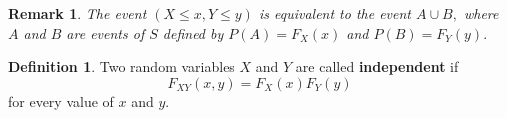 \documentclass[12pt, a4paper]{article}
\newtheorem*{remark}{Remark}
\theoremstyle{definition}
\newtheorem{definition}{Definition}[section]
\theoremstyle{plain}
\begin{document}
\begin{remark}
The event $(X\leq x, Y \leq y)$ is equivalent to the event $A\cup B,$ where $A$ and $B$ are events of $S$ defined by $P(A)=F_X(x)$ and $P(B)=F_Y(y).$ 
\end{remark}

\begin{definition}
Two random variables $X$ and $Y$ are called \textbf{independent} if $$F_{XY}(x,y)=F_X(x)F_Y(y)$$ for every value of $x$ and $y.$
\end{definition}
\end{document}
